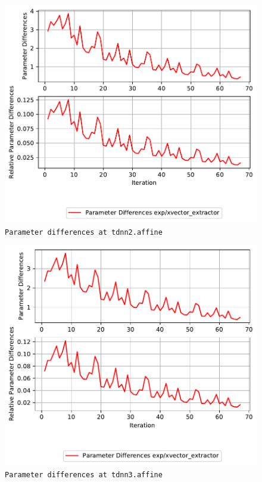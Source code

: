 \documentclass[prl,10pt,twocolumn]{revtex4}
\begin{document}
\newpage
\begin{figure}[h]
  \begin{center}
    \caption{\texttt{Parameter differences at tdnn2.affine}}
    \includegraphics[width=\textwidth]{exp/xvector_extractor/report/param_diff_tdnn2_dot_affine.pdf}
  \end{center}
\end{figure}
\clearpage


\newpage
\begin{figure}[h]
  \begin{center}
    \caption{\texttt{Parameter differences at tdnn3.affine}}
    \includegraphics[width=\textwidth]{exp/xvector_extractor/report/param_diff_tdnn3_dot_affine.pdf}
  \end{center}
\end{figure}
\clearpage
\end{document}
